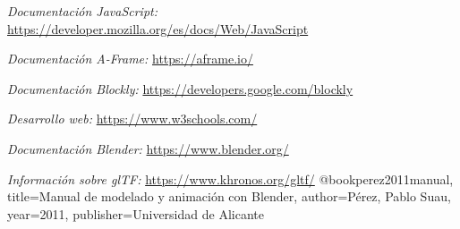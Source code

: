 \begin{thebibliography}{0}

    \textit{Documentación JavaScript:}
    \url{https://developer.mozilla.org/es/docs/Web/JavaScript}
    
    \textit{Documentación A-Frame:}
    \url{https://aframe.io/}
    
    \textit{Documentación Blockly:}
    \url{https://developers.google.com/blockly}
    
    \textit{Desarrollo web:}
    \url{https://www.w3schools.com/}
    
    \textit{Documentación Blender:}
    \url{https://www.blender.org/}
    
    \textit{Información sobre glTF:}
    \url{https://www.khronos.org/gltf/}
    @book{perez2011manual,
  title={Manual de modelado y animaci{\'o}n con Blender},
  author={P{\'e}rez, Pablo Suau},
  year={2011},
  publisher={Universidad de Alicante}
}
\end{thebibliography}